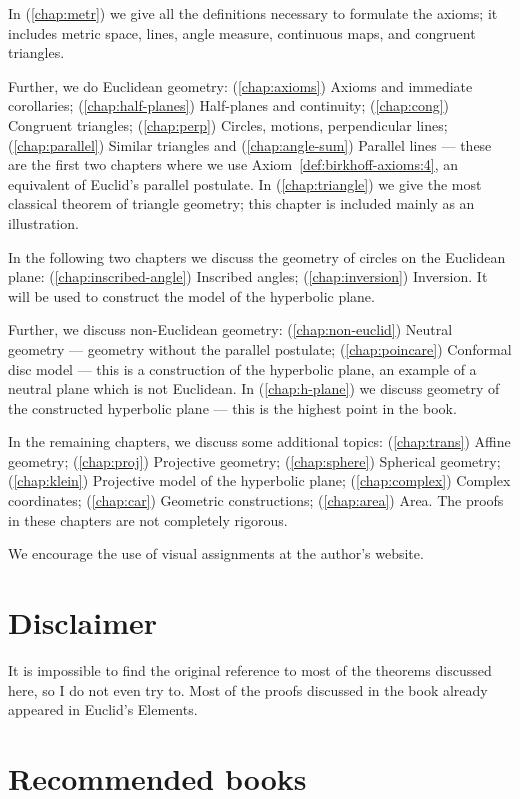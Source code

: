 In (\ref{chap:metr}) we give all the definitions necessary to formulate the axioms;
it includes metric space, 
lines, 
angle measure, 
continuous maps,
and congruent triangles.

Further, we do Euclidean geometry:
(\ref{chap:axioms}) Axioms and immediate corollaries;
(\ref{chap:half-planes}) Half-planes and continuity;
(\ref{chap:cong}) Congruent triangles;
(\ref{chap:perp}) Circles, motions, perpendicular lines;
(\ref{chap:parallel}) Similar triangles and (\ref{chap:angle-sum}) Parallel lines  
--- these are the first two chapters where we use Axiom~\ref{def:birkhoff-axioms:4}, an equivalent of Euclid's parallel postulate.
In (\ref{chap:triangle}) we give the most classical theorem of triangle geometry;
this chapter is included mainly as an illustration.

In the following two chapters we discuss the geometry of circles on the Euclidean plane:
(\ref{chap:inscribed-angle}) Inscribed angles; (\ref{chap:inversion}) Inversion.
It  will be used to construct the model of the hyperbolic plane.

Further, we discuss non-Euclidean geometry:
(\ref{chap:non-euclid})
Neutral geometry --- geometry without the parallel postulate;
(\ref{chap:poincare})
Conformal disc model ---
this is a construction of the hyperbolic plane,
an example of a neutral plane which is not Euclidean.
In (\ref{chap:h-plane}) we discuss geometry of the constructed hyperbolic plane --- this is the highest point in the book.

In the remaining chapters, we discuss some additional topics:
(\ref{chap:trans}) Affine geometry;
(\ref{chap:proj}) Projective geometry;
(\ref{chap:sphere}) Spherical geometry;
(\ref{chap:klein}) Projective model of the hyperbolic plane;
(\ref{chap:complex}) Complex coordinates;
(\ref{chap:car}) Geometric constructions;
(\ref{chap:area}) Area.
The proofs in these chapters are not completely rigorous.

We encourage the use of visual assignments at the author's website.

\section*{Disclaimer}

It is  impossible to find the original reference to most of the theorems discussed here, so I do not even try to.
Most of the proofs discussed in the book 
already appeared in Euclid's Elements.

\section*{Recommended books}

